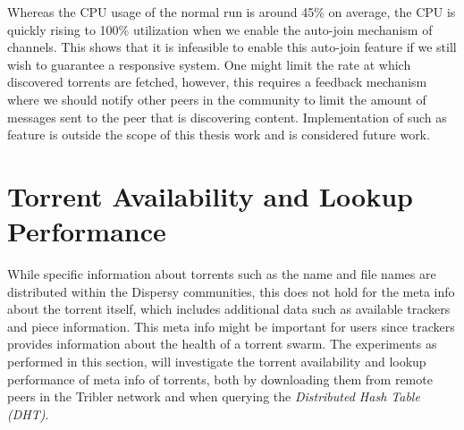 Whereas the CPU usage of the normal run is around 45\% on average, the CPU is quickly rising to 100\% utilization when we enable the auto-join mechanism of channels. This shows that it is infeasible to enable this auto-join feature if we still wish to guarantee a responsive system. One might limit the rate at which discovered torrents are fetched, however, this requires a feedback mechanism where we should notify other peers in the community to limit the amount of messages sent to the peer that is discovering content. Implementation of such as feature is outside the scope of this thesis work and is considered future work.

\section{Torrent Availability and Lookup Performance}
While specific information about torrents such as the name and file names are distributed within the Dispersy communities, this does not hold for the meta info about the torrent itself, which includes additional data such as available trackers and piece information. This meta info might be important for users since trackers provides information about the health of a torrent swarm. The experiments as performed in this section, will investigate the torrent availability and lookup performance of meta info of torrents, both by downloading them from remote peers in the Tribler network and when querying the \emph{Distributed Hash Table (DHT)}.

